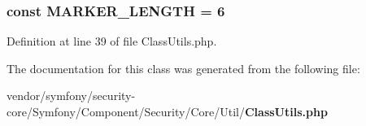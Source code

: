 \subsubsection[{M\+A\+R\+K\+E\+R\+\_\+\+L\+E\+N\+G\+T\+H}]{\setlength{\rightskip}{0pt plus 5cm}const M\+A\+R\+K\+E\+R\+\_\+\+L\+E\+N\+G\+T\+H = 6}\label{class_symfony_1_1_component_1_1_security_1_1_core_1_1_util_1_1_class_utils_adab40214090628561cb6bb76aa5a9b35}


Definition at line 39 of file Class\+Utils.\+php.



The documentation for this class was generated from the following file\+:\begin{DoxyCompactItemize}
\item 
vendor/symfony/security-\/core/\+Symfony/\+Component/\+Security/\+Core/\+Util/{\bf Class\+Utils.\+php}\end{DoxyCompactItemize}
